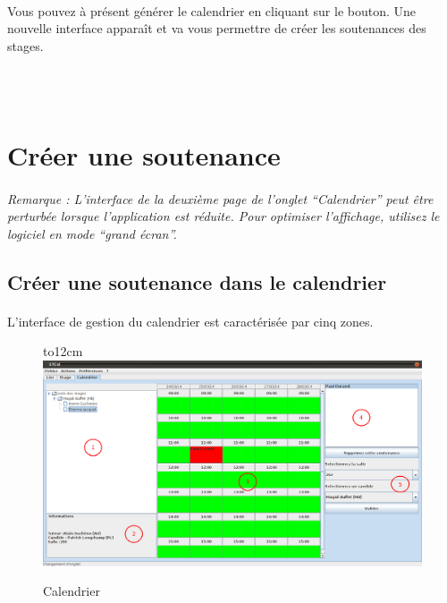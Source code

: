 \documentclass[a4paper,10pt]{report}
\begin{document}
      \paragraph{}
	Vous pouvez à présent générer le calendrier en cliquant sur le bouton.
	Une nouvelle interface apparaît et va vous permettre de créer les soutenances des stages.
      
      ~\\~\\
    \section{Créer une soutenance}
    
	\paragraph{}
	  \textit{Remarque : L'interface de la deuxième page de l'onglet ``Calendrier'' peut être perturbée lorsque l'application est réduite. Pour optimiser l'affichage, utilisez le logiciel en mode ``grand écran''.}
    
      \subsection{Créer une soutenance dans le calendrier}
	\paragraph{}
	  L'interface de gestion du calendrier est caractérisée par cinq zones.
	  
	  \begin{figure}[H]
	    \hbox to12cm{\hss\includegraphics[width=18cm]{../general/Calendrier2.png}\hss}
	    \caption{Calendrier}
	  \end{figure}
	  
\end{document}
